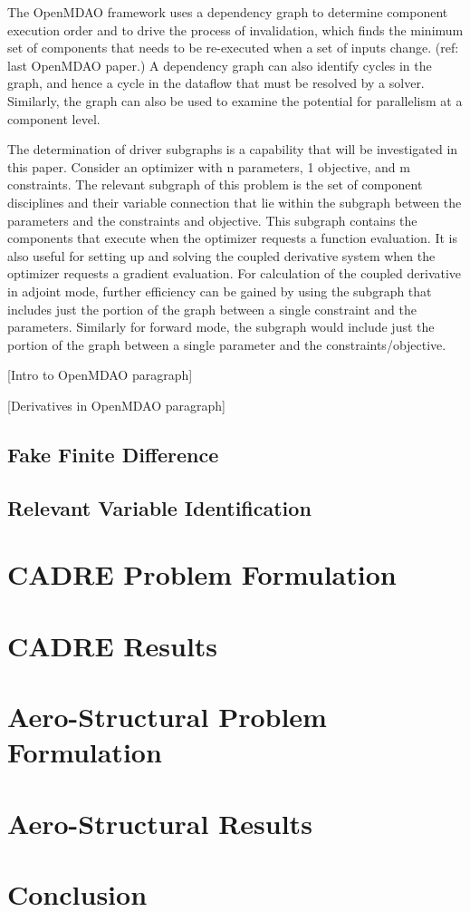 \documentclass[]{aiaa-tc} %
\begin{document}
    The OpenMDAO framework uses a dependency graph to determine component execution order and to
    drive the process of invalidation, which finds the minimum set of components that needs to
    be re-executed when a set of inputs change. (ref: last OpenMDAO paper.) A dependency graph
    can also identify cycles in the graph, and hence a cycle in the dataflow that must be resolved
    by a solver. Similarly, the graph can also be used to examine the potential for parallelism at
    a component level.

    The determination of driver subgraphs is a capability that will be investigated in this paper.
    Consider an optimizer with n parameters, 1 objective, and m constraints. The relevant 
    subgraph of this problem is the set of component disciplines and their variable connection that
    lie within the subgraph between the parameters and the constraints and objective. This subgraph
    contains the components that execute when the optimizer requests a function evaluation. It is
    also useful for setting up and solving the coupled derivative system when the optimizer requests
    a gradient evaluation. For calculation of the coupled derivative in adjoint mode, further
    efficiency can be gained by using the subgraph that includes just the portion of the graph 
    between a single constraint and the parameters. Similarly for forward mode, the subgraph would
    include just the portion of the graph between a single parameter and the constraints/objective.

    [Intro to OpenMDAO paragraph]

    [Derivatives in OpenMDAO paragraph]


    \subsection{Fake Finite Difference}
    \subsection{Relevant Variable Identification}

  \section{CADRE Problem Formulation}

  \section{CADRE Results}

  \section{Aero-Structural Problem Formulation}

  \section{Aero-Structural Results}

  \section{Conclusion}
 
  
\end{document}
